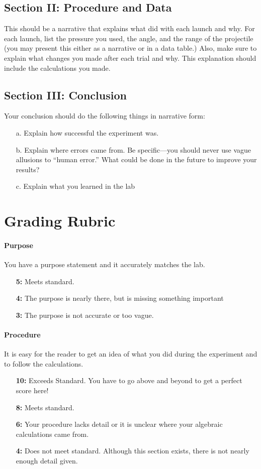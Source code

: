 \documentclass[10pt]{exam}
\begin{document}
\subsection*{Section II: Procedure and Data}
This should be a narrative that explains what did with each launch and why.  For each launch, list the pressure you used, the angle, and the range of the projectile (you may present this either as a narrative or in a data table.)  Also, make sure to explain what changes you made after each trial and why.  This explanation should include the calculations you made.

\subsection*{Section III: Conclusion}
Your conclusion should do the following things in narrative form:
\begin{itemize}
  \item[a.] Explain how successful the experiment was.
  \item[b.] Explain where errors came from. Be specific—you should never use vague allusions to “human error.”  What could be done in the future to improve your results?
  \item[c.] Explain what you learned in the lab
\end{itemize}


\section*{Grading Rubric}


\paragraph{Purpose} You have a purpose statement and it accurately matches the lab.	
\begin{itemize}
  \item[\bf 5:] Meets standard.	
  \item[\bf 4:] The purpose is nearly there, but is missing something important
  \item[\bf 3:] The purpose is not accurate or too vague.
\end{itemize}


\paragraph{Procedure} It is easy for the reader to get an idea of what you did during the experiment and to follow the calculations.
\begin{itemize}
  \item[\bf 10:] Exceeds Standard. You have to go above and beyond to get a perfect score here!
  \item[\bf 8:] Meets standard.
  \item[\bf 6:] Your procedure lacks detail or it is unclear where your algebraic calculations came from.
  \item[\bf 4:] Does not meet standard.  Although this section exists, there is not nearly enough detail given.
\end{itemize}
\end{document}
